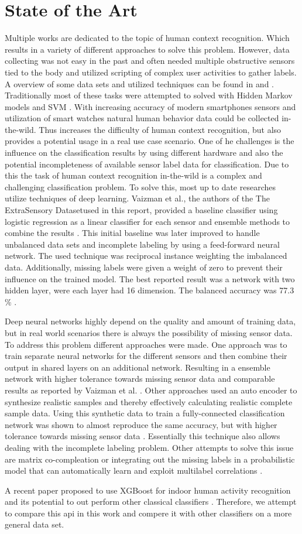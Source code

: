 \section{State of the Art}
Multiple works are dedicated to the topic of human context recognition. Which results in a variety of different approaches to solve this problem. However, data collecting was not easy in the past and often needed multiple obstructive sensors tied to the body and utilized scripting of complex user activities to gather labels. A overview of some data sets and utilized techniques can be found in \cite{Ramasamy18} and \cite{Lara13}. Traditionally most of these tasks were attempted to solved with Hidden Markov models \cite{Lee11} and SVM \cite{Anguita12}. 
With increasing accuracy of modern smartphones sensors and utilization of smart watches natural human behavior data could be collected in-the-wild. Thus increases the difficulty of human context recognition, but also provides a potential usage in a real use case scenario.  One of he challenges is the influence on the classification results by using different hardware \cite{Stisen15} and also the potential incompleteness of available sensor label data for classification. Due to this the task of human context recognition in-the-wild is a complex and challenging classification problem. 
To solve this, most up to date researches utilize techniques of deep learning. Vaizman et al., the authors of the \gl The ExtraSensory Dataset\gr  used in this report, provided a baseline classifier using logistic regression as a linear classifier for each sensor and ensemble methods to combine the results \cite{Vaizman17}. This initial baseline was later improved to handle unbalanced data sets and incomplete labeling by using a feed-forward neural network. The used technique was reciprocal instance weighting the imbalanced data. Additionally, missing labels were given a weight of zero to prevent their influence on the trained model. The best reported result was a network with two hidden layer, were each layer had 16 dimension. The balanced accuracy was 77.3 \% \cite{Vaizman18}. 

Deep neural networks highly depend on the quality and amount of training data, but in real world scenarios there is always the possibility of missing sensor data. To address this problem different approaches were made. One approach was to train separate neural networks for the different sensors and then combine their output in shared layers on an additional network. Resulting in a ensemble network with higher tolerance towards missing sensor data and comparable results as reported by Vaizman et al. \cite{Saeed18}. Other approaches used an auto encoder to synthesize realistic samples and thereby effectively calculating realistic complete sample data. Using this synthetic data to train a fully-connected classification network was shown to almost reproduce the same accuracy, but with higher tolerance towards missing sensor data \cite{Saeed18-2}. Essentially this technique also allows dealing with the incomplete labeling problem. Other attempts to solve this issue are matrix co-compleation \cite{Xu18} or integrating out the missing labels in a probabilistic model that can automatically learn and exploit multilabel correlations \cite{Bi14}.

A recent paper proposed to use XGBoost for indoor human activity recognition and its potential to out perform other classical classifiers \cite{Zhang19}. Therefore, we attempt to compare this api in this work and compere it with other classifiers on a more general data set. 

